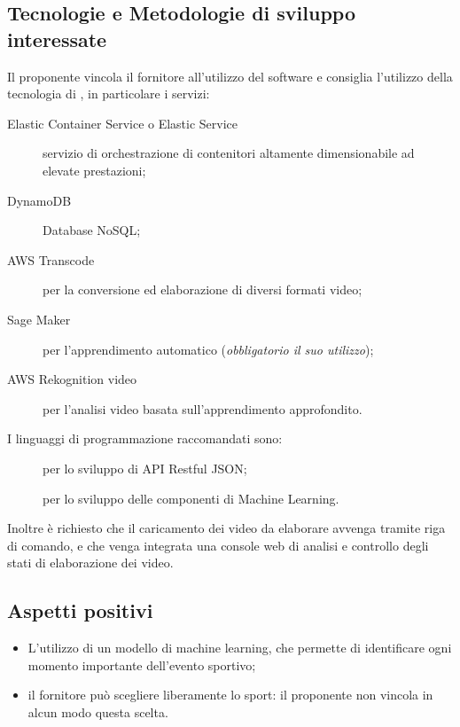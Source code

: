 \documentclass[../studio-di-fattibilita.tex]{subfiles}
\begin{document}
\subsection{Tecnologie e Metodologie di sviluppo interessate}%
\label{subsec:tecnologie_interessate}
Il proponente vincola il fornitore all'utilizzo del software  e consiglia l'utilizzo della tecnologia di , in particolare i servizi:
\begin{description}
  \item[Elastic Container Service o Elastic  Service] servizio di orchestrazione di contenitori altamente dimensionabile ad elevate prestazioni;
  \item[DynamoDB] Database NoSQL;
  \item[AWS Transcode] per la conversione ed elaborazione di diversi formati video;
  \item[Sage Maker] per l'apprendimento automatico (\textit{obbligatorio il suo utilizzo});
  \item[AWS Rekognition video] per l'analisi video basata sull'apprendimento approfondito.
\end{description}
I linguaggi di programmazione raccomandati sono:
\begin{description}
  \item[] per lo sviluppo di API Restful JSON;
  \item[] per lo sviluppo delle componenti di Machine Learning.
\end{description}
Inoltre è richiesto che il caricamento dei video da elaborare avvenga tramite riga di comando, e che venga integrata una console web di analisi e controllo degli stati di elaborazione dei video.


\subsection{Aspetti positivi}%
\label{subsec:aspetti_positivi}
\begin{itemize}
  \item L'utilizzo di un modello di machine learning, che permette di identificare ogni momento importante dell’evento sportivo;
  \item il fornitore può scegliere liberamente lo sport: il proponente non vincola in alcun modo questa scelta.
\end{itemize}
\end{document}
